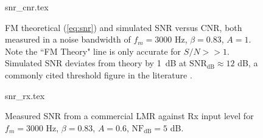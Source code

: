 \documentclass{article}
\begin{document}
\begin{figure}[h]
\caption{FM theoretical (\ref{eq:snr}) and simulated SNR versus CNR, both measured in a noise bandwidth of $f_m=3000$ Hz, $\beta=0.83$, $A=1$. Note the ``FM Theory" line is only accurate for $S/N>>1$. Simulated SNR deviates from theory by 1~dB at $\mathrm{SNR_{dB}} \approx 12$ dB, a commonly cited threshold figure in the literature \cite{crilly2009communication}.}
\label{fig:snr_cnr}
\begin{center}
 {snr_cnr.tex}
\end{center}
\end{figure}

\begin{figure}[h]
\caption{Measured SNR from a commercial LMR against Rx input level for $f_m=3000$ Hz, $\beta=0.83$, $A=0.6$, $\mathrm{NF_{dB}}=5$ dB.}
\label{fig:snr_rx}
\begin{center}
 {snr_rx.tex}
\end{center}
\end{figure}



\end{document}
